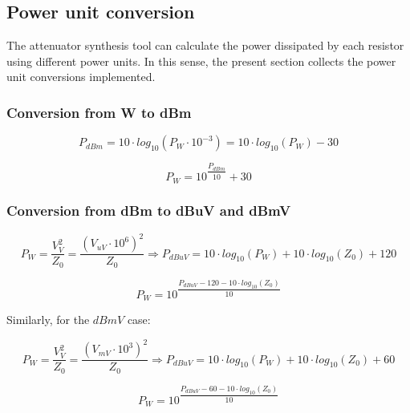 \clearpage
\subsection{Power unit conversion}

\noindent The attenuator synthesis tool can calculate the power dissipated by each resistor using different power units. In this sense, the present section collects the power unit conversions implemented.

\subsubsection{Conversion from W to dBm}
\begin{equation}
P_{dBm} = 10 \cdot log_{10} (P_{W} \cdot 10^{-3}) = 10 \cdot log_{10} (P_{W}) - 30
\end{equation}

\begin{equation}
P_{W} = 10^{\dfrac{P_{dBm}}{10}} + 30
\end{equation}

\subsubsection{Conversion from dBm to dBuV and dBmV}
\begin{equation}
P_{W} = \dfrac{V_{V}^2}{Z_{0}} = \dfrac{(V_{uV} \cdot 10^{6})^2}{Z_{0}} \Longrightarrow P_{dBuV} = 10 \cdot log_{10} \left( P_{W} \right) + 10 \cdot log_{10} \left( Z_0 \right) +120
\end{equation}

\begin{equation}
P_{W} = 10^{\dfrac{P_{dBuV} - 120 - 10\cdot log_{10} (Z_0)}{10}}
\end{equation}

\noindent Similarly, for the $dBmV$ case:

\begin{equation}
P_{W} = \dfrac{V_{V}^2}{Z_{0}} = \dfrac{(V_{mV} \cdot 10^{3})^2}{Z_{0}} \Longrightarrow P_{dBuV} = 10 \cdot log_{10} \left( P_{W} \right) + 10 \cdot log_{10} \left( Z_0 \right) + 60
\end{equation}

\begin{equation}
P_{W} = 10^{\dfrac{P_{dBuV} - 60 - 10\cdot log_{10} (Z_0)}{10}}
\end{equation}


